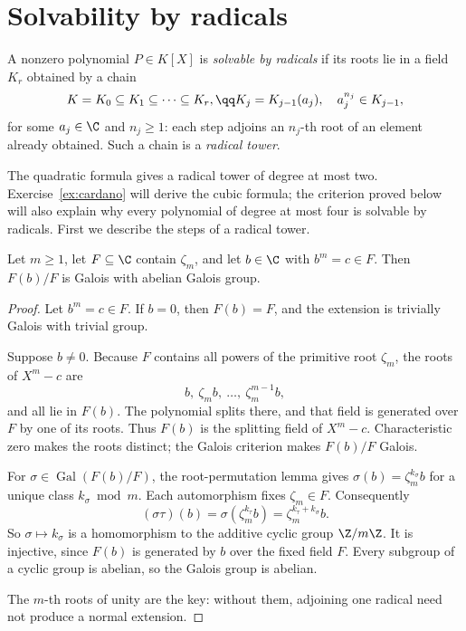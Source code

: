\section{Solvability by radicals}\label{sec:radicals}

\begin{definition}
A nonzero polynomial $P\in K[X]$ is \emph{solvable by radicals} if its roots lie in a field $K_r$ obtained by a chain
\[
\begin{gathered}K=K_0\subseteq K_1\subseteq\dots\subseteq K_r,\qq K_j=K_{j-1}(a_j),\quad a_j^{n_j}\in K_{j-1},\end{gathered}
\]
for some $a_j\in\C$ and $n_j\ge1$: each step adjoins an $n_j$-th root of an element already obtained. Such a chain is a \emph{radical tower}.
\end{definition}

The quadratic formula gives a radical tower of degree at most two. Exercise~\ref{ex:cardano} will derive the cubic formula; the criterion proved below will also explain why every polynomial of degree at most four is solvable by radicals. First we describe the steps of a radical tower.

\begin{lemma}\label{lem:kummerstep}
Let $m\ge1$, let $F\subseteq\C$ contain $\zeta_m$, and let $b\in\C$ with $b^m=c\in F$. Then $F(b)/F$ is Galois with abelian Galois group.
\end{lemma}
\begin{proof}
Let $b^m=c\in F$. If $b=0$, then
$F(b)=F$, and the extension is
trivially Galois with trivial group.

Suppose $b\ne0$. Because $F$ contains
all powers of the primitive root
$\zeta_m$, the roots of $X^m-c$
are
\[
b,\ \zeta_m b,\ \ldots,\ \zeta_m^{m-1}b,
\]
and all lie in $F(b)$.
The polynomial splits there, and
that field is generated over $F$
by one of its roots. Thus $F(b)$
is the splitting field of $X^m-c$.
Characteristic zero makes the roots
distinct; the Galois criterion makes
$F(b)/F$ Galois.

For $\sigma\in\operatorname{Gal}(F(b)/F)$,
the root-permutation lemma gives
$\sigma(b)=\zeta_m^{k_\sigma}b$
for a unique class $k_\sigma\bmod m$.
Each automorphism fixes $\zeta_m\in F$.
Consequently
\[
(\sigma\tau)(b)
=\sigma(\zeta_m^{k_\tau}b)
=\zeta_m^{k_\tau+k_\sigma}b.
\]
So $\sigma\mapsto k_\sigma$ is a
homomorphism to the additive cyclic
group $\Z/m\Z$. It is injective,
since $F(b)$ is generated by $b$
over the fixed field $F$.
Every subgroup of a cyclic group
is abelian, so the Galois group is abelian.

The $m$-th roots of unity are the key:
without them, adjoining one radical
need not produce a normal extension.
\end{proof}

